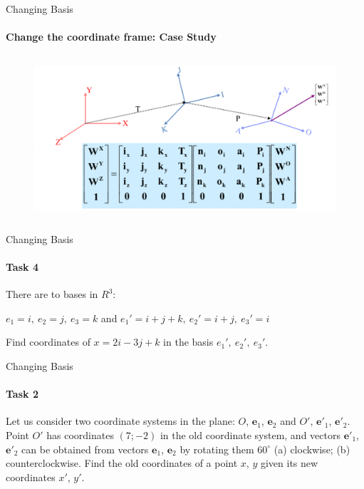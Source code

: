 \documentclass[aspectratio=169,notes]{beamer}
\begin{document}
        \begin{frame}[t]{Changing Basis}
            \framesubtitle{Change the coordinate frame: Case Study}
            \vspace{-0.6cm}
                \begin{figure}[H]
                    \centering\includegraphics[height=6cm,width=1\textwidth,keepaspectratio]{change_klimchik_4.png}
                    \label{fig:change_klimchik_4.png}
                \end{figure}
            \end{frame}


            
            \begin{frame}[t]{Changing Basis}
            \framesubtitle{Task 4}
            There are to bases in $R^3$:
            
            $e_1=i,\ e_2=j,\ e_3=k$ and $e_1'=i+j+k,\ e_2'=i+j,\ e_3'=i$
            
            Find coordinates of $x=2i-3j+k$ in the basis $e_1',\ e_2',\ e_3'$.
            \end{frame}

\begin{frame}[t]{Changing Basis}
\framesubtitle{Task 2}
Let us consider two coordinate systems in the plane: $O$, $\textbf{e}_1$, $\textbf{e}_2$ and $O'$, $\textbf{e}'_1$, $\textbf{e}'_2$. Point $O'$ has coordinates $(7;-2)$ in the old coordinate system, and vectors $\textbf{e}'_1$, $\textbf{e}'_2$ can be obtained from vectors $\textbf{e}_1$, $\textbf{e}_2$ by rotating them $60^{\circ}$ (a) clockwise; (b) counterclockwise. Find the old coordinates of a point $x$, $y$ given its new coordinates $x'$, $y'$.
\end{frame}
\end{document}
